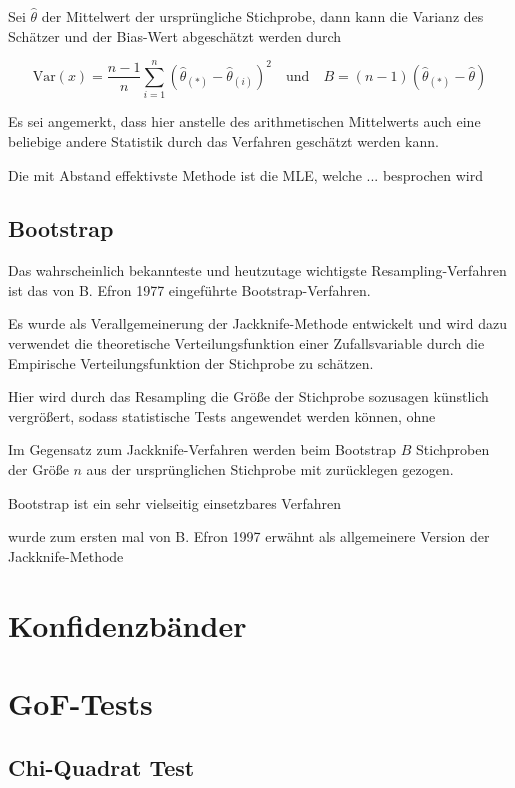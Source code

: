 Sei $\hat{\theta}$ der Mittelwert der ursprüngliche Stichprobe, dann kann die Varianz des Schätzer und der Bias-Wert abgeschätzt werden durch

\begin{equation}
\mathrm{Var}(x) = \frac{n-1}{n} \sum_{i=1}^{n} \left( \hat{\theta}_{(*)} - \hat{\theta}_{(i)} \right)^2
\quad\text{und}\quad
B = (n-1) (\hat{\theta}_{(*)} - \hat{\theta})
\end{equation}

Es sei angemerkt, dass hier anstelle des arithmetischen Mittelwerts auch eine beliebige andere Statistik durch das Verfahren geschätzt werden kann.

Die mit Abstand effektivste Methode ist die MLE, welche ... besprochen wird

\subsection{Bootstrap}
Das wahrscheinlich bekannteste und heutzutage wichtigste Resampling-Verfahren ist das von B. Efron 1977 eingeführte Bootstrap-Verfahren.

Es wurde als Verallgemeinerung der Jackknife-Methode entwickelt und wird dazu verwendet die theoretische Verteilungsfunktion einer Zufallsvariable durch die Empirische Verteilungsfunktion der Stichprobe zu schätzen.

Hier wird durch das Resampling die Größe der Stichprobe sozusagen künstlich vergrößert, sodass statistische Tests angewendet werden können, ohne 

Im Gegensatz zum Jackknife-Verfahren werden beim Bootstrap $B$ Stichproben der Größe $n$ aus der ursprünglichen Stichprobe mit zurücklegen gezogen.



Bootstrap ist ein sehr vielseitig einsetzbares Verfahren

wurde zum ersten mal von B. Efron 1997 erwähnt als allgemeinere Version der Jackknife-Methode

\section{Konfidenzbänder}

\section{GoF-Tests}

\subsection{Chi-Quadrat Test}


